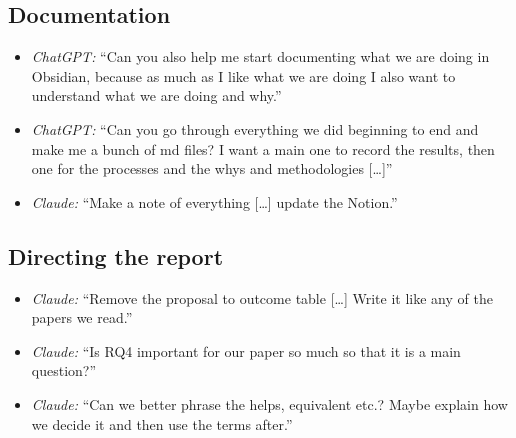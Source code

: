 \subsection*{Documentation}
\begin{itemize}
  \item \emph{ChatGPT:} ``Can you also help me start documenting what we are
        doing in Obsidian, because as much as I like what we are doing I also
        want to understand what we are doing and why.''
  \item \emph{ChatGPT:} ``Can you go through everything we did beginning to end
        and make me a bunch of md files? I want a main one to record the
        results, then one for the processes and the whys and methodologies
        [\ldots]''
  \item \emph{Claude:} ``Make a note of everything [\ldots] update the
        Notion.''
\end{itemize}

\subsection*{Directing the report}
\begin{itemize}
  \item \emph{Claude:} ``Remove the proposal to outcome table [\ldots]
        Write it like any of the papers we read.''
  \item \emph{Claude:} ``Is RQ4 important for our paper so much so that
        it is a main question?''
  \item \emph{Claude:} ``Can we better phrase the helps, equivalent
        etc.? Maybe explain how we decide it and then use the terms after.''
\end{itemize}
